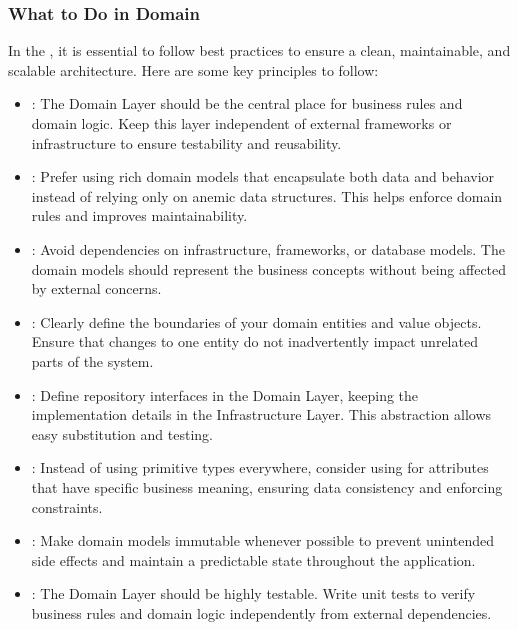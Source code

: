 \documentclass[letterpaper,10pt,english]{sphinxhowto}
\begin{document}
\subsubsection{What to Do in Domain}
\label{\detokenize{architecture/domain/index:what-to-do-in-domain}}
\sphinxAtStartPar
In the , it is essential to follow best practices to ensure a clean, maintainable, and scalable architecture. Here are some key principles to follow:
\begin{itemize}
\item {} 
\sphinxAtStartPar
{}:
The Domain Layer should be the central place for business rules and domain logic. Keep this layer independent of external frameworks or infrastructure to ensure testability and reusability.

\item {} 
\sphinxAtStartPar
{}:
Prefer using rich domain models that encapsulate both data and behavior instead of relying only on anemic data structures. This helps enforce domain rules and improves maintainability.

\item {} 
\sphinxAtStartPar
{}:
Avoid dependencies on infrastructure, frameworks, or database models. The domain models should represent the business concepts without being affected by external concerns.

\item {} 
\sphinxAtStartPar
{}:
Clearly define the boundaries of your domain entities and value objects. Ensure that changes to one entity do not inadvertently impact unrelated parts of the system.

\item {} 
\sphinxAtStartPar
{}:
Define repository interfaces in the Domain Layer, keeping the implementation details in the Infrastructure Layer. This abstraction allows easy substitution and testing.

\item {} 
\sphinxAtStartPar
{}:
Instead of using primitive types everywhere, consider using  for attributes that have specific business meaning, ensuring data consistency and enforcing constraints.

\item {} 
\sphinxAtStartPar
{}:
Make domain models immutable whenever possible to prevent unintended side effects and maintain a predictable state throughout the application.

\item {} 
\sphinxAtStartPar
{}:
The Domain Layer should be highly testable. Write unit tests to verify business rules and domain logic independently from external dependencies.

\end{itemize}
\end{document}
